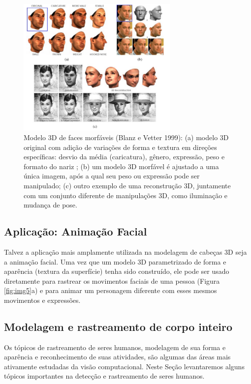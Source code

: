 \documentclass{article}
\begin{document}
\begin{figure}[!htb]
    \centering
    \includegraphics[width=0.7\textwidth]{img6.png}
    \caption{Modelo 3D de faces morfáveis (Blanz e Vetter 1999)\cite{Blanz:1999:MMS:311535.311556}: (a) modelo 3D original com adição de variações de forma e textura em direções específicas: desvio da média (caricatura), gênero, expressão, peso e formato do nariz ; (b) um modelo 3D morfável é ajustado a uma única imagem, após a qual seu peso ou expressão pode ser manipulado; (c) outro exemplo de uma reconstrução 3D, juntamente com um conjunto diferente de manipulações 3D, como iluminação e mudança de pose.
}
    \label{fig:img6}
\end{figure}

\subsection{Aplicação: Animação Facial}
Talvez a aplicação mais amplamente utilizada na modelagem de cabeças 3D seja a animação facial. Uma vez que um modelo 3D parametrizado de forma e aparência (textura da superfície) tenha sido construído, ele pode ser usado diretamente para rastrear os movimentos faciais de uma pessoa (Figura \ref{fig:img5}a) e para animar um personagem diferente com esses mesmos movimentos e expressões.

\subsection{Modelagem e rastreamento de corpo inteiro}
Os tópicos de rastreamento de seres humanos, modelagem de sua forma e aparência e reconhecimento de suas atividades, são algumas das áreas mais ativamente estudadas da visão computacional. Neste Seção levantaremos alguns tópicos importantes na detecção e rastreamento de seres humanos.
\end{document}

